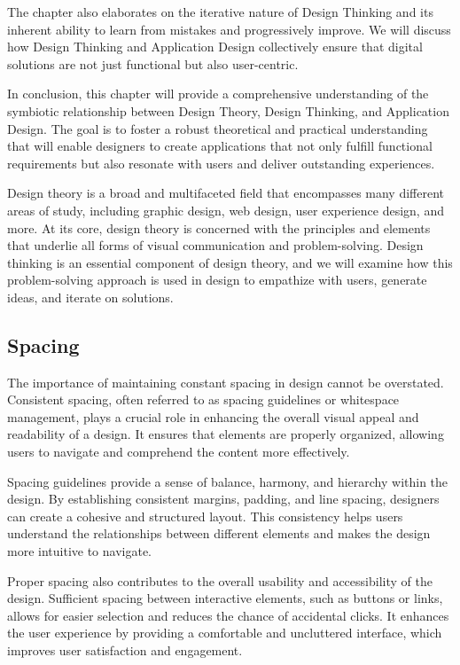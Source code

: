 \hspace{\parindent}The chapter also elaborates on the iterative nature of Design Thinking and its inherent ability to learn from mistakes and progressively improve. We will discuss how Design Thinking and Application Design collectively ensure that digital solutions are not just functional but also user-centric.

\hspace{\parindent}In conclusion, this chapter will provide a comprehensive understanding of the symbiotic relationship between Design Theory, Design Thinking, and Application Design. The goal is to foster a robust theoretical and practical understanding that will enable designers to create applications that not only fulfill functional requirements but also resonate with users and deliver outstanding experiences.


Design theory is a broad and multifaceted field that encompasses many different areas of study, including graphic design, web design, user experience design, and more.  At its core, design theory is concerned with the principles and elements that underlie all forms of visual communication and problem-solving.
Design thinking is an essential component of design theory, and we will examine how this problem-solving approach is used in design to empathize with users, generate ideas, and iterate on solutions.

\subsection{Spacing}
The importance of maintaining constant spacing in design cannot be overstated. Consistent spacing, often referred to as spacing guidelines or whitespace management, plays a crucial role in enhancing the overall visual appeal and readability of a design. It ensures that elements are properly organized, allowing users to navigate and comprehend the content more effectively.

Spacing guidelines provide a sense of balance, harmony, and hierarchy within the design. By establishing consistent margins, padding, and line spacing, designers can create a cohesive and structured layout. This consistency helps users understand the relationships between different elements and makes the design more intuitive to navigate.

Proper spacing also contributes to the overall usability and accessibility of the design. Sufficient spacing between interactive elements, such as buttons or links, allows for easier selection and reduces the chance of accidental clicks. It enhances the user experience by providing a comfortable and uncluttered interface, which improves user satisfaction and engagement.

